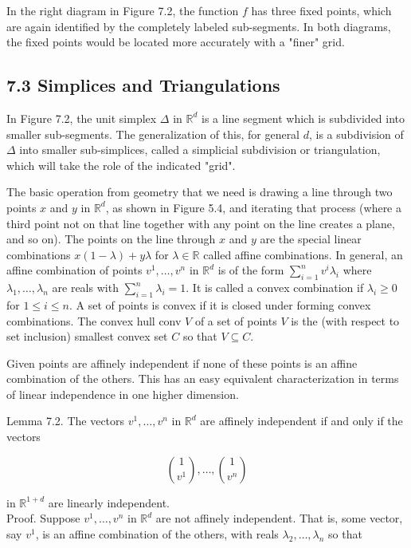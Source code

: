 \documentclass[12pt]{article}
\begin{document}
In the right diagram in Figure 7.2, the function $f$ has three fixed points, which are again identified by the completely labeled sub-segments. In both diagrams, the fixed points would be located more accurately with a "finer" grid.

\subsection*{7.3 Simplices and Triangulations}
In Figure 7.2, the unit simplex $\Delta$ in $\mathbb{R}^{d}$ is a line segment which is subdivided into smaller sub-segments. The generalization of this, for general $d$, is a subdivision of $\Delta$ into smaller sub-simplices, called a simplicial subdivision or triangulation, which will take the role of the indicated "grid".

The basic operation from geometry that we need is drawing a line through two points $x$ and $y$ in $\mathbb{R}^{d}$, as shown in Figure 5.4, and iterating that process (where a third point not on that line together with any point on the line creates a plane, and so on). The points on the line through $x$ and $y$ are the special linear combinations $x(1-\lambda)+y \lambda$ for $\lambda \in \mathbb{R}$ called affine combinations. In general, an affine combination of points $v^{1}, \ldots, v^{n}$ in $\mathbb{R}^{d}$ is of the form $\sum_{i=1}^{n} v^{i} \lambda_{i}$ where $\lambda_{1}, \ldots, \lambda_{n}$ are reals with $\sum_{i=1}^{n} \lambda_{i}=1$. It is called a convex combination if $\lambda_{i} \geq 0$ for $1 \leq i \leq n$. A set of points is convex if it is closed under forming convex combinations. The convex hull conv $V$ of a set of points $V$ is the (with respect to set inclusion) smallest convex set $C$ so that $V \subseteq C$.

Given points are affinely independent if none of these points is an affine combination of the others. This has an easy equivalent characterization in terms of linear independence in one higher dimension.

Lemma 7.2. The vectors $v^{1}, \ldots, v^{n}$ in $\mathbb{R}^{d}$ are affinely independent if and only if the vectors


\begin{equation*}
\binom{1}{v^{1}}, \ldots,\binom{1}{v^{n}} \tag{7.4}
\end{equation*}


in $\mathbb{R}^{1+d}$ are linearly independent.\\
Proof. Suppose $v^{1}, \ldots, v^{n}$ in $\mathbb{R}^{d}$ are not affinely independent. That is, some vector, say $v^{1}$, is an affine combination of the others, with reals $\lambda_{2}, \ldots, \lambda_{n}$ so that
\end{document}
